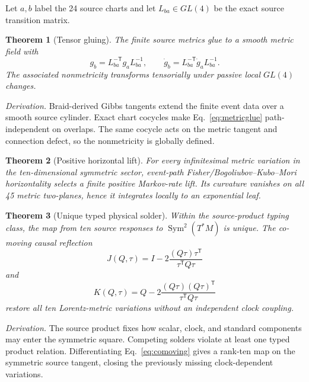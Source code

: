 \documentclass[11pt]{article}
\newtheorem{theorem}{Theorem}[section]
\theoremstyle{definition}
\theoremstyle{remark}
\newcommand{\Sym}{\operatorname{Sym}}
\begin{document}
Let $a,b$ label the 24 source charts and let $L_{ba}\in GL(4)$ be the exact source transition matrix.

\begin{theorem}[Tensor gluing]
The finite source metrics glue to a smooth metric field with
\begin{equation}
g_b=L_{ba}^{-\mathsf T}g_aL_{ba}^{-1},
\qquad
\dot g_b=L_{ba}^{-\mathsf T}\dot g_aL_{ba}^{-1}.
\label{eq:metricglue}
\end{equation}
The associated nonmetricity transforms tensorially under passive local $GL(4)$ changes.
\end{theorem}

\textit{Derivation.} Braid-derived Gibbs tangents extend the finite event data over a smooth source cylinder. Exact chart cocycles make Eq.~\eqref{eq:metricglue} path-independent on overlaps. The same cocycle acts on the metric tangent and connection defect, so the nonmetricity is globally defined.

\begin{theorem}[Positive horizontal lift]
For every infinitesimal metric variation in the ten-dimensional symmetric sector, event-path Fisher/Bogoliubov--Kubo--Mori horizontality selects a finite positive Markov-rate lift. Its curvature vanishes on all 45 metric two-planes, hence it integrates locally to an exponential leaf.
\end{theorem}

\begin{theorem}[Unique typed physical solder]
Within the source-product typing class, the map from ten source responses to $\Sym^2(T^*M)$ is unique. The co-moving causal reflection
\begin{equation}
J(Q,\tau)=I-2\frac{(Q\tau)\tau^{\mathsf T}}{\tau^{\mathsf T}Q\tau}
\end{equation}
and
\begin{equation}
K(Q,\tau)=Q-2\frac{(Q\tau)(Q\tau)^{\mathsf T}}{\tau^{\mathsf T}Q\tau}
\label{eq:comoving}
\end{equation}
restore all ten Lorentz-metric variations without an independent clock coupling.
\end{theorem}

\textit{Derivation.} The source product fixes how scalar, clock, and standard components may enter the symmetric square. Competing solders violate at least one typed product relation. Differentiating Eq.~\eqref{eq:comoving} gives a rank-ten map on the symmetric source tangent, closing the previously missing clock-dependent variations.
\end{document}
